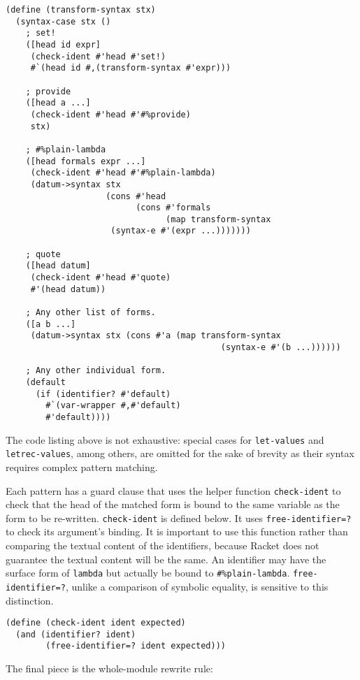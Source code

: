 \documentclass{article}
\begin{document}
\begin{lstlisting}
(define (transform-syntax stx)
  (syntax-case stx ()
    ; set!
    ([head id expr]
     (check-ident #'head #'set!)
     #`(head id #,(transform-syntax #'expr)))

    ; provide
    ([head a ...]
     (check-ident #'head #'#%provide)
     stx)

    ; #%plain-lambda
    ([head formals expr ...]
     (check-ident #'head #'#%plain-lambda)
     (datum->syntax stx
                    (cons #'head
                          (cons #'formals
                                (map transform-syntax
				     (syntax-e #'(expr ...)))))))

    ; quote
    ([head datum]
     (check-ident #'head #'quote)
     #'(head datum))

    ; Any other list of forms.
    ([a b ...]
     (datum->syntax stx (cons #'a (map transform-syntax
                                           (syntax-e #'(b ...))))))

    ; Any other individual form.
    (default
      (if (identifier? #'default)
        #`(var-wrapper #,#'default)
        #'default))))
\end{lstlisting}

The code listing above is not exhaustive: special cases for \texttt{let-values} and \texttt{letrec-values}, among others, are omitted for the sake of brevity as their syntax requires complex pattern matching.

Each pattern has a guard clause that uses the helper function \texttt{check-ident} to check that the head of the matched form is bound to the same variable as the form to be re-written. \texttt{check-ident} is defined below. It uses \texttt{free-identifier=?} to check its argument's binding. It is important to use this function rather than comparing the textual content of the identifiers, because Racket does not guarantee the textual content will be the same. An identifier may have the surface form of \texttt{lambda} but actually be bound to \texttt{\#\%plain-lambda}. \texttt{free-identifier=?}, unlike a comparison of symbolic equality, is sensitive to this distinction.

\begin{lstlisting}
(define (check-ident ident expected)
  (and (identifier? ident)
        (free-identifier=? ident expected)))
\end{lstlisting}

The final piece is the whole-module rewrite rule:
\end{document}
